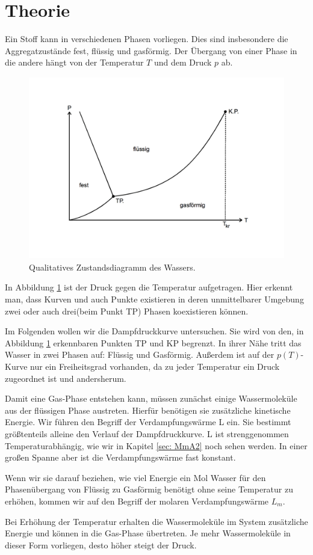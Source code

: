  \section{Theorie}
\label{sec:Theorie}

Ein Stoff kann in verschiedenen Phasen vorliegen. Dies sind insbesondere die Aggregatzustände fest, flüssig und gasförmig.
Der Übergang von einer Phase in die andere hängt von der Temperatur $T$ und dem Druck $p$ ab.

\begin{figure}
  \centering
  \includegraphics[height = 8cm]{Phasendiagramm.pdf}
  \caption{Qualitatives Zustandsdiagramm des Wassers.}
  \label{fig: Wasserdiagramm}
\end{figure}

In Abbildung \ref{fig: Wasserdiagramm} ist der Druck gegen die Temperatur aufgetragen.
Hier erkennt man, dass Kurven und auch Punkte existieren in deren unmittelbarer Umgebung zwei oder auch drei(beim Punkt TP) Phasen koexistieren können.

Im Folgenden wollen wir die Dampfdruckkurve untersuchen. Sie wird von den, in Abbildung \ref{fig: Wasserdiagramm} erkennbaren Punkten TP und KP
begrenzt. In ihrer Nähe tritt das Wasser in zwei Phasen auf: Flüssig und Gasförmig. Außerdem ist auf der $p(T)$-Kurve nur ein Freiheitsgrad
vorhanden, da zu jeder Temperatur ein Druck zugeordnet ist und andersherum.

Damit eine Gas-Phase entstehen kann, müssen zunächst einige Wassermoleküle aus der flüssigen Phase austreten. Hierfür benötigen sie zusätzliche
kinetische Energie. Wir führen den Begriff der Verdampfungswärme L ein. Sie bestimmt größtenteils alleine den Verlauf der Dampfdruckkurve. L ist
strenggenommen Temperaturabhängig, wie wir in Kapitel \ref{sec: MmA2} noch sehen werden. In einer großen Spanne aber ist die Verdampfungswärme
fast konstant.

Wenn wir sie darauf beziehen, wie viel Energie ein Mol Wasser für den Phasenübergang von Flüssig zu Gasförmig benötigt ohne seine Temperatur zu
erhöhen, kommen wir auf den Begriff der molaren Verdampfungswärme $L_{m}$.

Bei Erhöhung der Temperatur erhalten die Wassermoleküle im System zusätzliche Energie und können in die Gas-Phase übertreten. Je mehr Wassermoleküle
in dieser Form vorliegen, desto höher steigt der Druck.
\newpage
